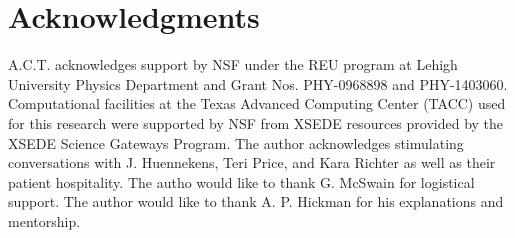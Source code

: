 \documentclass[letterpaper,titlepage,12pt]{article}
\begin{document}
\clearpage
\section{Acknowledgments}
A.C.T. acknowledges support by NSF under the REU program at Lehigh University
Physics Department and Grant Nos. PHY-0968898 and PHY-1403060.  Computational
facilities at the Texas Advanced Computing Center (TACC) used for this research
were supported by NSF from XSEDE resources provided by the XSEDE Science
Gateways Program.  The author acknowledges stimulating conversations with J.
Huennekens, Teri Price, and Kara Richter as well as their patient hospitality.
The autho would like to thank G. McSwain for logistical support.  The author
would like to thank A. P. Hickman for his explanations and mentorship.

\clearpage

\end{document}
